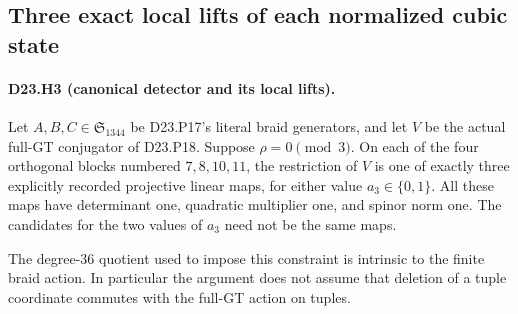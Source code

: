\subsection{Three exact local lifts of each normalized cubic state}

\paragraph{D23.H3 (canonical detector and its local lifts).}
Let $A,B,C\in\mathfrak S_{1344}$ be D23.P17's literal braid
generators, and let $V$ be the actual full-GT conjugator of
D23.P18. Suppose $\rho=0\pmod3$. On each of the four
orthogonal blocks numbered $7,8,10,11$, the restriction of
$V$ is one of exactly three explicitly recorded projective
linear maps, for either value $a_3\in\{0,1\}$.
All these maps have determinant one, quadratic multiplier
one, and spinor norm one. The candidates for the two values
of $a_3$ need not be the same maps.

The degree-$36$ quotient used to impose this constraint is
intrinsic to the finite braid action. In particular the
argument does not assume that deletion of a tuple coordinate
commutes with the full-GT action on tuples.

